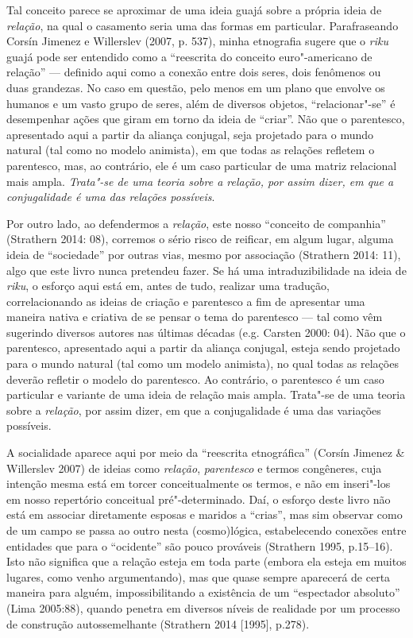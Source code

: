 Tal conceito parece se aproximar de uma ideia guajá sobre a própria
ideia de \emph{relação}, na qual o casamento seria uma das formas em
particular. Parafraseando Corsín Jimenez e Willerslev (2007, p. 537),
minha etnografia sugere que o \emph{riku} guajá pode ser entendido como
a ``reescrita do conceito euro"-americano de relação'' --- definido aqui como
a conexão entre dois seres, dois fenômenos ou duas grandezas. No caso em
questão, pelo menos em um plano que envolve os humanos e um vasto grupo
de seres, além de diversos objetos, ``relacionar"-se'' é desempenhar ações
que giram em torno da ideia de ``criar''. Não que o parentesco,
apresentado aqui a partir da aliança conjugal, seja projetado para o
mundo natural (tal como no modelo animista), em que todas as relações
refletem o parentesco, mas, ao contrário, ele é um caso particular de
uma matriz relacional mais ampla. \emph{Trata"-se de uma teoria sobre a
relação, por assim dizer, em que a conjugalidade é uma das relações
possíveis}.

Por outro lado, ao defendermos a \emph{relação}, este nosso ``conceito
de companhia'' (Strathern 2014: 08), corremos o sério risco de reificar,
em algum lugar, alguma ideia de ``sociedade'' por outras vias, mesmo por
associação (Strathern 2014: 11), algo que este livro nunca pretendeu
fazer. Se há uma intraduzibilidade na ideia de \emph{riku}, o esforço
aqui está em, antes de tudo, realizar uma tradução, correlacionando as
ideias de criação e parentesco a fim de apresentar uma maneira nativa e
criativa de se pensar o tema do parentesco --- tal como vêm sugerindo
diversos autores nas últimas décadas (e.g. Carsten 2000: 04). Não que o
parentesco, apresentado aqui a partir da aliança conjugal, esteja sendo
projetado para o mundo natural (tal como um modelo animista), no qual
todas as relações deverão refletir o modelo do parentesco. Ao contrário,
o parentesco é um caso particular e variante de uma ideia de relação
mais ampla. Trata"-se de uma teoria sobre a \emph{relação}, por assim
dizer, em que a conjugalidade é uma das variações possíveis.

A socialidade aparece aqui por meio da ``reescrita etnográfica'' (Corsín
Jimenez \& Willerslev 2007) de ideias como \emph{relação},
\emph{parentesco} e termos congêneres, cuja intenção mesma está em
torcer conceitualmente os termos, e não em inseri"-los em nosso
repertório conceitual pré"-determinado. Daí, o esforço deste livro não
está em associar diretamente esposas e maridos a ``crias'', mas sim
observar como de um campo se passa ao outro nesta (cosmo)lógica,
estabelecendo conexões entre entidades que para o ``ocidente'' são pouco
prováveis (Strathern 1995, p.15--16). Isto não significa que a relação
esteja em toda parte (embora ela esteja em muitos lugares, como venho
argumentando), mas que quase sempre aparecerá de certa maneira para
alguém, impossibilitando a existência de um ``espectador absoluto'' (Lima
2005:88), quando penetra em diversos níveis de realidade por um processo
de construção autossemelhante (Strathern 2014 {[}1995{]}, p.278).

